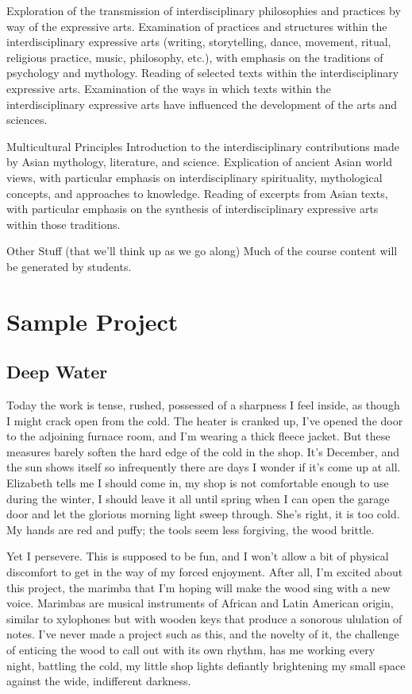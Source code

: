 \documentclass[letterpaper,10pt,headsepline]{scrreprt}
\begin{document}
\begin{compactdesc}
Exploration of the transmission of interdisciplinary philosophies and practices by way of the expressive arts.
Examination of practices and structures within the interdisciplinary expressive arts (writing, storytelling, dance, movement, ritual, religious practice, music, philosophy, etc.), with emphasis on the traditions of psychology and mythology.
Reading of selected texts within the interdisciplinary expressive arts.
Examination of the ways in which texts within the interdisciplinary expressive arts have influenced the development of the arts and sciences.
\\
\item[Multicultural Principles]
Introduction to the interdisciplinary contributions made by Asian mythology, literature, and science.
Explication of ancient Asian world views, with particular emphasis on interdisciplinary spirituality, mythological concepts, and approaches to knowledge.
Reading of excerpts from Asian texts, with particular emphasis on the synthesis of interdisciplinary expressive arts within those traditions.
\\
\item[Other Stuff (that we'll think up as we go along)]
Much of the course content will be generated by students.
\end{compactdesc}
\section{Sample Project}

\subsection{Deep Water}

Today the work is tense, rushed, possessed of a sharpness I feel inside, as though I might crack open from the cold. The heater is cranked up, I’ve opened the door to the adjoining furnace room, and I’m wearing a thick fleece jacket. But these measures barely soften the hard edge of the cold in the shop. It’s December, and the sun shows itself so infrequently there are days I wonder if it’s come up at all. Elizabeth tells me I should come in, my shop is not comfortable enough to use during the winter, I should leave it all until spring when I can open the garage door and let the glorious morning light sweep through. She’s right, it is too cold. My hands are red and puffy; the tools seem less forgiving, the wood brittle.

Yet I persevere. This is supposed to be fun, and I ­won’t allow a bit of physical discomfort to get in the way of my forced enjoyment. After all, I’m excited about this project, the marimba that I’m hoping will make the wood sing with a new voice. Marimbas are musical instruments of African and Latin American origin, similar to xylophones but with wooden keys that produce a sonorous ululation of notes. I’ve never made a project such as this, and the novelty of it, the challenge of enticing the wood to call out with its own rhythm, has me working every night, battling the cold, my little shop lights defiantly brightening my small space against the wide, indifferent darkness.
\end{document}
